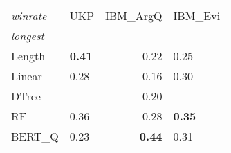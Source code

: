 \begin{tabular}{llrl}
\toprule
\textit{winrate} &   UKP &  IBM\_ArgQ & IBM\_Evi \\
\textit{longest}  &       &           &         \\
\midrule
Length &  \textbf{0.41} &      0.22 &    0.25 \\
Linear &  0.28 &      0.16 &     0.30 \\
DTree  &     - &      0.20 &       - \\
RF     &  0.36 &      0.28 &    \textbf{0.35} \\
BERT\_Q &  0.23 &      \textbf{0.44} &    0.31 \\
\bottomrule
\end{tabular}
